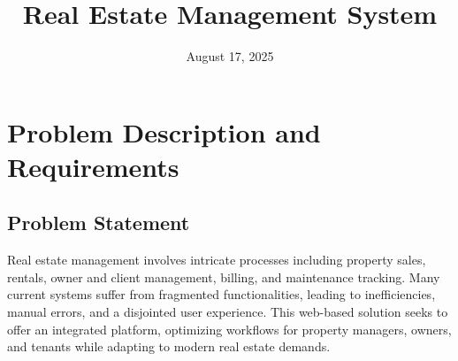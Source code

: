 \documentclass[12pt]{article}
\title{Real Estate Management System}
\author{}
\date{August 17, 2025}
\begin{document}
\maketitle

\section{Problem Description and Requirements}

\subsection{Problem Statement}
Real estate management involves intricate processes including property sales, rentals, owner and client management, billing, and maintenance tracking. Many current systems suffer from fragmented functionalities, leading to inefficiencies, manual errors, and a disjointed user experience. This web-based solution seeks to offer an integrated platform, optimizing workflows for property managers, owners, and tenants while adapting to modern real estate demands.
\end{document}
